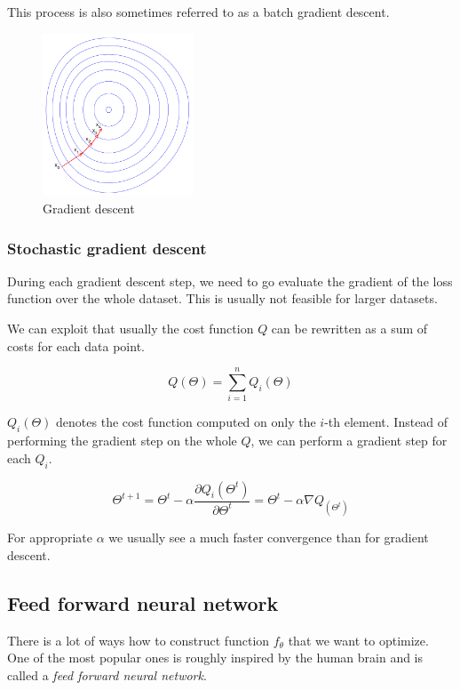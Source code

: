     This process is also sometimes referred to as a batch gradient descent.

    \begin{figure}
    \centerline{\includegraphics[width=0.4\textwidth]{images/gradient_descent}}
    \caption[Gradient descent]{Gradient descent \cite{pict}}
    \label{obr:gradient}
    \end{figure}
    
    
    \subsubsection{Stochastic gradient descent}
    
    During each gradient descent step, we need to go evaluate the gradient of the loss function over the whole dataset.
    This is usually not feasible for larger datasets. 
    
    We can exploit that usually the cost function $Q$ can be rewritten as a sum of costs for each data point.
    
    $$Q(\Theta) = \sum_{i=1}^n Q_i(\Theta)$$
    
    $Q_i(\Theta)$ denotes the cost function computed on only the $i$-th element. 
    Instead of performing the gradient step on the whole $Q$, 
    we can perform a gradient step for each $Q_i$. 

    $$\Theta^{t+1} = \Theta^t - \alpha \frac{\partial Q_i(\Theta^t)}{\partial \Theta^t} = \Theta^t - \alpha \nabla Q_(\Theta^t)$$
    
    For appropriate $\alpha$ we usually see a much faster convergence than for gradient descent.
    
    
    \subsection{Feed forward neural network}
    There is a lot of ways how to construct function $f_\theta$ that we want to optimize. 
    One of the most popular ones is roughly inspired by the human brain and is called a \textit{feed forward neural network}.
    
